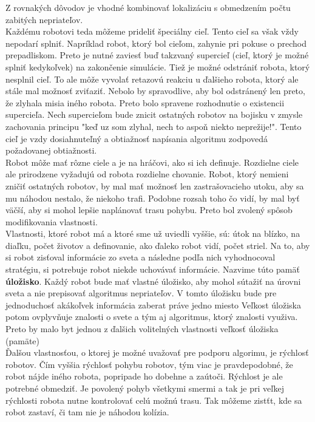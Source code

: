 Z rovnakých dôvodov je vhodné kombinovať lokalizáciu s obmedzením počtu zabitých nepriateľov. \\
Každému robotovi teda môžeme prideliť špeciálny cieľ. Tento cieľ sa však vždy nepodarí splniť. Napríklad robot, ktorý bol cieľom, zahynie pri pokuse o prechod prepadliskom. Preto je nutné zaviesť buď takzvaný supercieľ (cieľ, ktorý je možné splniť kedykoľvek)  na zakončenie simulácie. Tiež je možné odstrániť robota, ktorý nesplnil cieľ. To ale môže vyvolať retazovú reakciu u ďalšieho robota, ktorý ale stále mal možnosť zviťaziť. Nebolo by spravodlive,  aby bol odstránený len preto, že zlyhala misia iného robota. Preto bolo spravene rozhodnutie o existencii supercieľa. Nech supercieľom bude znicit ostatných robotov na bojisku v zmysle zachovania principu "keď uz som zlyhal, nech to aspoň niekto neprežije!". Tento cieľ je vzdy dosiahnuteľný a obtiažnosť napísania algoritmu zodpovedá požadovanej obtiažnosti.\\
Robot môže mať rôzne ciele a je na hráčovi, ako si ich definuje. Rozdielne ciele ale prirodzene vyžadujú od robota rozdielne chovanie. Robot, ktorý nemieni zničiť ostatných robotov, by mal mať možnosť len zastrašovacieho utoku, aby sa mu náhodou nestalo, že niekoho trafi. Podobne rozsah toho čo vidí, by mal byť väčší, aby si mohol lepšie naplánovať trasu pohybu. Preto bol zvolený spôsob modifikovania vlastnosti. \\ Vlastnosti, ktoré robot má a ktoré sme už uviedli vyššie,  sú:
útok na blízko, na diaľku, počet životov a definovanie, ako ďaleko robot vidí, počet striel. Na to, aby si robot zisťoval informácie zo sveta a následne podľa nich vyhodnocoval stratégiu, si potrebuje robot niekde uchovávať informácie. Nazvime túto pamäť {\bf úložisko}. Každý robot bude mať vlastné úložisko, aby mohol sútažiť na úrovni sveta a nie prepisovať algoritmus nepriateľov. V tomto úložisku bude pre jednoduchosť akákoľvek informácia zaberat práve jedno miesto%
Veľkost úložiska potom ovplyvňuje znalosti o svete a tým aj algoritmus, ktorý znalosti využiva. Preto by malo byt jednou z ďalšich volitelných vlastnosti veľkosť úložiska (pamäte) \\ %
Ďalšou vlastnosťou,  o ktorej je možné uvažovať pre podporu algorimu, je rýchlosť robotov. %
Čím vyššia rýchlosť pohybu robotov, tým viac je pravdepodobné, že robot nájde iného robota, popripade ho dobehne a zaútoči. Rýchlost je ale potrebné obmedziť. Je povolený pohyb všetkymi smermi a tak je pri veľkej rýchlosti robota nutne kontrolovať celú možnú trasu. Tak môžeme zistťt, kde sa robot zastaví, či tam nie je náhodou kolízia. \\
